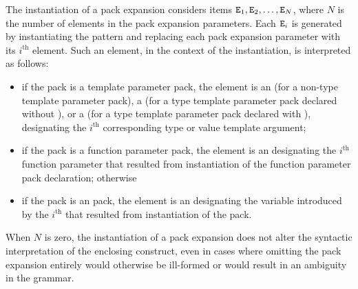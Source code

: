 \documentclass{wg21}
\begin{document}
\pnum
The instantiation of a pack expansion considers
items $\texttt{E}_1, \texttt{E}_2, \dotsc, \texttt{E}_N$,
where
$N$ is the number of elements in the pack expansion parameters.
Each $\texttt{E}_i$ is generated by instantiating the pattern and
replacing each pack expansion parameter with its $i^\text{th}$ element.
Such an element, in the context of the instantiation, is interpreted as
follows:
\begin{itemize}
    \item
    if the pack is a template parameter pack, the element is
    an 
    (for a non-type template parameter pack),
    a 
    (for a type template parameter pack declared without ), or
    a 
    (for a type template parameter pack declared with ),
    designating the $i^\text{th}$ corresponding type or value template argument;

    \item
    if the pack is a function parameter pack, the element is an
    designating the $i^\text{th}$ function parameter
    that resulted from instantiation of
    the function parameter pack declaration;
    otherwise

    \item
    if the pack is an  pack,
    the element is an 
    designating the variable introduced by
    the $i^\text{th}$ 
    that resulted from instantiation of
    the  pack.


\end{itemize}
When $N$ is zero, the instantiation of a pack expansion
does not alter the syntactic interpretation of the enclosing construct,
even in cases where omitting the pack expansion entirely would
otherwise be ill-formed or would result in an ambiguity in the grammar.
\end{document}
